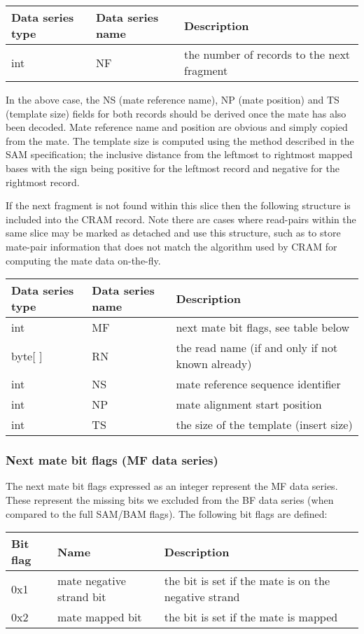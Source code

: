 \documentclass[a4paper]{article}
\begin{document}
\begin{tabular}{|>{\raggedright}p{68pt}|>{\raggedright}p{115pt}|>{\raggedright}p{228pt}|}
\hline
\textbf{Data series type} & \textbf{Data series name} & \textbf{Description}\tabularnewline
\hline
int & NF & the number of records to the next fragment\tabularnewline
\hline
\end{tabular}

In the above case, the NS (mate reference name), NP (mate position) and TS (template size) fields for both records should be derived once the mate has also been decoded.
Mate reference name and position are obvious and simply copied from the mate.
The template size is computed using the method described in the SAM specification; the inclusive distance from the leftmost to rightmost mapped bases with the sign being positive for the leftmost record and negative for the rightmost record.

If the next fragment is not found within this slice then the following structure is included into the CRAM record.
Note there are cases where read-pairs within the same slice may be marked as detached and use this structure, such as to store mate-pair information that does not match the algorithm used by CRAM for computing the mate data on-the-fly.

\begin{tabular}{|>{\raggedright}p{66pt}|>{\raggedright}p{117pt}|>{\raggedright}p{228pt}|}
\hline
\textbf{Data series type} & \textbf{Data series name} & \textbf{Description}\tabularnewline
\hline
int & MF & next mate bit flags, see table below\tabularnewline
\hline
byte[ ] & RN & the read name (if and only if not known already)\tabularnewline
\hline
int & NS & mate reference sequence identifier \tabularnewline
\hline
int & NP & mate alignment start position \tabularnewline
\hline
int & TS & the size of the template (insert size)\tabularnewline
\hline
\end{tabular}

\subsubsection*{Next mate bit flags (MF data series)}

The next mate bit flags expressed as an integer represent the MF data series.
These represent the missing bits we excluded from the BF data series (when compared to the full SAM/BAM flags).
The following bit flags are defined:

\begin{tabular}{|>{\raggedright}p{47pt}|>{\raggedright}p{134pt}|>{\raggedright}p{250pt}|}
\hline
\textbf{Bit flag} & \textbf{Name} & \textbf{Description}\tabularnewline
\hline
0x1 & mate negative strand bit & the bit is set if the mate is on the negative
strand\tabularnewline
\hline
0x2 & mate mapped bit & the bit is set if the mate is mapped\tabularnewline
\hline
\end{tabular}
\end{document}
